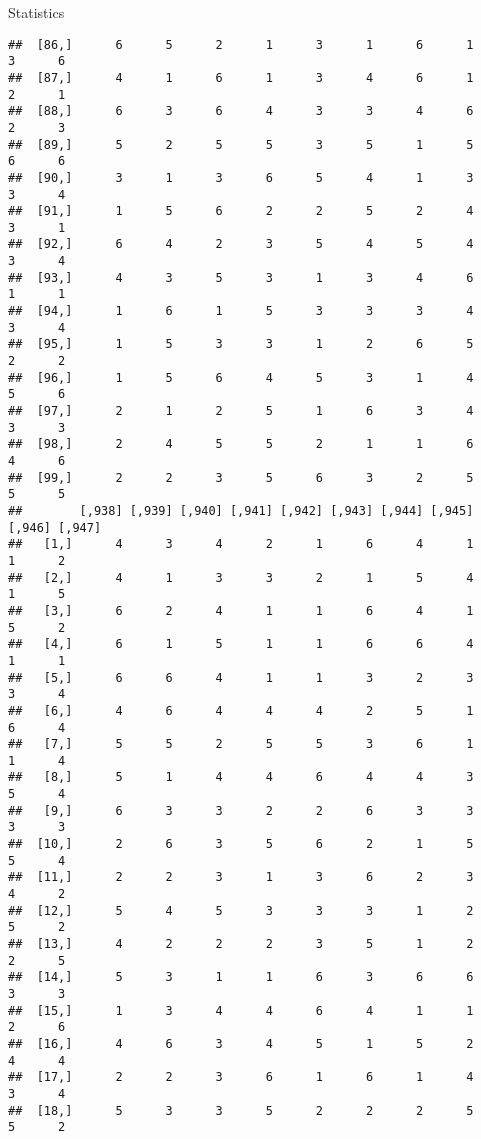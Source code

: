 \documentclass[
  ignorenonframetext,
]{beamer}
\begin{document}
\begin{frame}[fragile]{Statistics}
\begin{verbatim}
##  [86,]      6      5      2      1      3      1      6      1      3      6
##  [87,]      4      1      6      1      3      4      6      1      2      1
##  [88,]      6      3      6      4      3      3      4      6      2      3
##  [89,]      5      2      5      5      3      5      1      5      6      6
##  [90,]      3      1      3      6      5      4      1      3      3      4
##  [91,]      1      5      6      2      2      5      2      4      3      1
##  [92,]      6      4      2      3      5      4      5      4      3      4
##  [93,]      4      3      5      3      1      3      4      6      1      1
##  [94,]      1      6      1      5      3      3      3      4      3      4
##  [95,]      1      5      3      3      1      2      6      5      2      2
##  [96,]      1      5      6      4      5      3      1      4      5      6
##  [97,]      2      1      2      5      1      6      3      4      3      3
##  [98,]      2      4      5      5      2      1      1      6      4      6
##  [99,]      2      2      3      5      6      3      2      5      5      5
##        [,938] [,939] [,940] [,941] [,942] [,943] [,944] [,945] [,946] [,947]
##   [1,]      4      3      4      2      1      6      4      1      1      2
##   [2,]      4      1      3      3      2      1      5      4      1      5
##   [3,]      6      2      4      1      1      6      4      1      5      2
##   [4,]      6      1      5      1      1      6      6      4      1      1
##   [5,]      6      6      4      1      1      3      2      3      3      4
##   [6,]      4      6      4      4      4      2      5      1      6      4
##   [7,]      5      5      2      5      5      3      6      1      1      4
##   [8,]      5      1      4      4      6      4      4      3      5      4
##   [9,]      6      3      3      2      2      6      3      3      3      3
##  [10,]      2      6      3      5      6      2      1      5      5      4
##  [11,]      2      2      3      1      3      6      2      3      4      2
##  [12,]      5      4      5      3      3      3      1      2      5      2
##  [13,]      4      2      2      2      3      5      1      2      2      5
##  [14,]      5      3      1      1      6      3      6      6      3      3
##  [15,]      1      3      4      4      6      4      1      1      2      6
##  [16,]      4      6      3      4      5      1      5      2      4      4
##  [17,]      2      2      3      6      1      6      1      4      3      4
##  [18,]      5      3      3      5      2      2      2      5      5      2

\end{verbatim}
\end{frame}
\end{document}
